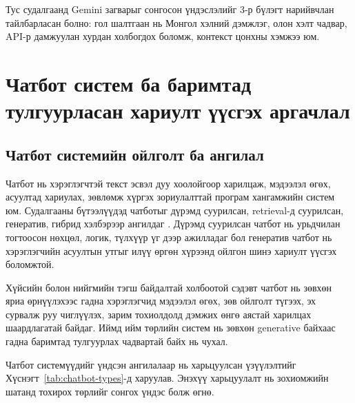 \FloatBarrier

Тус судалгаанд Gemini загварыг \cite{gemini_report} сонгосон үндэслэлийг 3-р бүлэгт нарийвчлан тайлбарласан болно: гол шалтгаан нь Монгол хэлний дэмжлэг, олон хэлт чадвар, API-р дамжуулан хурдан холбогдох боломж, контекст цонхны хэмжээ юм.


\section{Чатбот систем ба баримтад тулгуурласан хариулт үүсгэх аргачлал}

\subsection{Чатбот системийн ойлголт ба ангилал}

Чатбот нь хэрэглэгчтэй текст эсвэл дуу хоолойгоор харилцаж, мэдээлэл өгөх, асуултад хариулах, зөвлөмж хүргэх зориулалттай програм хангамжийн систем юм. Судалгааны бүтээлүүдэд чатботыг дүрэмд суурилсан, retrieval-д суурилсан, генератив, гибрид хэлбэрээр ангилдаг \cite{chatbot_review}. Дүрэмд суурилсан чатбот нь урьдчилан тогтоосон нөхцөл, логик, түлхүүр үг дээр ажилладаг бол генератив чатбот нь хэрэглэгчийн асуултын утгыг илүү өргөн хүрээнд ойлгон шинэ хариулт үүсгэх боломжтой.

Хүйсийн болон нийгмийн тэгш байдалтай холбоотой сэдэвт чатбот нь зөвхөн яриа өрнүүлэхээс гадна хэрэглэгчид мэдээлэл өгөх, зөв ойлголт түгээх, эх сурвалж руу чиглүүлэх, зарим тохиолдолд дэмжих өнгө аястай харилцах шаардлагатай байдаг. Иймд ийм төрлийн систем нь зөвхөн generative байхаас гадна баримтад тулгуурлах чадвартай байх нь чухал.

Чатбот системүүдийг үндсэн ангилалаар нь харьцуулсан үзүүлэлтийг Хүснэгт~\ref{tab:chatbot-types}-д харуулав. Энэхүү харьцуулалт нь зохиомжийн шатанд тохирох төрлийг сонгох үндэс болж өгнө.


